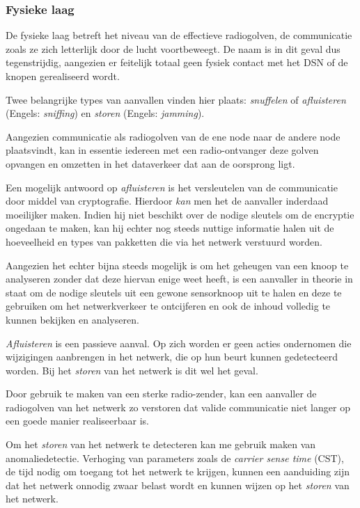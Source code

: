 \subsubsection*{Fysieke laag}

De fysieke laag betreft het niveau van de effectieve radiogolven, de
communicatie zoals ze zich letterlijk door de lucht voortbeweegt. De naam is in
dit geval dus tegenstrijdig, aangezien er feitelijk totaal geen fysiek contact
met het DSN of de knopen gerealiseerd wordt.

Twee belangrijke types van aanvallen vinden hier plaats: \emph{snuffelen} of
\emph{afluisteren} (Engels: \emph{sniffing}) en \emph{storen} (Engels:
\emph{jamming}).

Aangezien communicatie als radiogolven van de ene node naar de andere node
plaatsvindt, kan in essentie iedereen met een radio-ontvanger deze golven
opvangen en omzetten in het dataverkeer dat aan de oorsprong ligt.

Een mogelijk antwoord op \emph{afluisteren} is het versleutelen van de
communicatie door middel van cryptografie. Hierdoor \emph{kan} men het de
aanvaller inderdaad moeilijker maken. Indien hij niet beschikt over de nodige
sleutels om de encryptie ongedaan te maken, kan hij echter nog steeds nuttige
informatie halen uit de hoeveelheid en types van pakketten die via het netwerk
verstuurd worden.

Aangezien het echter bijna steeds mogelijk is om het geheugen van een knoop te
analyseren zonder dat deze hiervan enige weet heeft, is een aanvaller in
theorie in staat om de nodige sleutels uit een gewone sensorknoop uit te halen
en deze te gebruiken om het netwerkverkeer te ontcijferen en ook de inhoud
volledig te kunnen bekijken en analyseren.

\emph{Afluisteren} is een passieve aanval. Op zich worden er geen acties
ondernomen die wijzigingen aanbrengen in het netwerk, die op hun beurt kunnen
gedetecteerd worden. Bij het \emph{storen} van het netwerk is dit wel het geval.

Door gebruik te maken van een sterke radio-zender, kan een aanvaller de
radiogolven van het netwerk zo verstoren dat valide communicatie niet langer op
een goede manier realiseerbaar is.

Om het \emph{storen} van het netwerk te detecteren kan me gebruik maken van
anomaliedetectie. Verhoging van parameters zoals de \emph{carrier sense time}
(CST), de tijd nodig om toegang tot het netwerk te krijgen, kunnen een
aanduiding zijn dat het netwerk onnodig zwaar belast wordt en kunnen wijzen op
het \emph{storen} van het netwerk.


